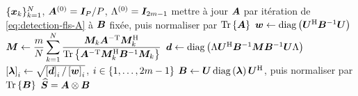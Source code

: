 \begin{algorithm}[htbp]
\caption{Estimation robuste à structure Kronecker et Toeplitz}
\label{alg:detection-fls-bcd}
\begin{algorithmic}[1]
  \Require $\{\boldsymbol{x}_k\}_{k=1}^{N}$, $\boldsymbol{A}^{(0)}=\boldsymbol{I}_{P}/P$, $\Lambda^{(0)}=\boldsymbol{I}_{2m-1}$
    \State mettre à jour $\boldsymbol{A}$ par itération de \cref{eq:detection-fls-A} à $\boldsymbol{B}$ fixée, puis normaliser par $\operatorname{\operatorname{Tr}}\left\{\boldsymbol{A}\right\}$
    \State $\boldsymbol{w} \gets \operatorname{\operatorname{diag}}\left(\boldsymbol{U}^{\mathrm{H}}{\boldsymbol{B}}^{-1}\boldsymbol{U}\right)$
    \State $\boldsymbol{M} \gets \dfrac{m}{N}\displaystyle\sum_{k=1}^{N}\dfrac{\boldsymbol{M}_k\boldsymbol{A}^{-\mathrm{T}}\boldsymbol{M}_k^{\mathrm{H}}}{\operatorname{\operatorname{Tr}}\left\{\boldsymbol{A}^{-\mathrm{T}}\boldsymbol{M}_k^{\mathrm{H}}{\boldsymbol{B}}^{-1}\boldsymbol{M}_k\right\}}$
    \State $\boldsymbol{d} \gets \operatorname{\operatorname{diag}}\left(\Lambda\boldsymbol{U}^{\mathrm{H}}{\boldsymbol{B}}^{-1}\boldsymbol{M}{\boldsymbol{B}}^{-1}\boldsymbol{U}\Lambda\right)$
    \State $\left[\boldsymbol{\lambda}\right]_i \gets \sqrt{\left[\boldsymbol{d}\right]_i/\left[\boldsymbol{w}\right]_i}$, \quad $i\in\{1,\dots,2m-1\}$
    \State $\boldsymbol{B} \gets \boldsymbol{U}\operatorname{\operatorname{diag}}\left(\boldsymbol{\lambda}\right)\boldsymbol{U}^{\mathrm{H}}$, puis normaliser par $\operatorname{\operatorname{Tr}}\left\{\boldsymbol{B}\right\}$
  \EndWhile
  \Ensure $\widehat{\boldsymbol{S}} = \boldsymbol{A}\otimes\boldsymbol{B}$
\end{algorithmic}
\end{algorithm}


